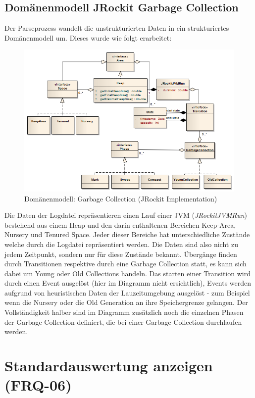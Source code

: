 \subsection{Domänenmodell JRockit Garbage Collection}\label{jrockit_domain_model}
Der Parseprozess wandelt die unstrukturierten Daten in ein strukturiertes Domänenmodell um. Dieses wurde wie folgt erarbeitet:
\begin{landscape}
 \begin{figure}[H]
  	\centering
        	\includegraphics[width=16.6cm]{images/jrockit_extension_domain}
	\caption{Domänenmodell: Garbage Collection (JRockit Implementation)}
\end{figure}
\end{landscape}
Die Daten der Logdatei repräsentieren einen Lauf einer JVM (\textit{JRockitJVMRun}) bestehend aus einem Heap und den darin enthaltenen Bereichen Keep-Area, Nursery und Tenured Space. Jeder dieser Bereiche hat unterschiedliche Zustände welche durch die Logdatei repräsentiert werden. Die Daten sind also nicht zu jedem Zeitpunkt, sondern nur für diese Zustände bekannt. Übergänge finden durch Transitionen respektive durch eine Garbage Collection statt, es kann sich dabei um Young oder Old Collections handeln. Das starten einer Transition wird durch einen Event ausgelöst (hier im Diagramm nicht ersichtlich), Events werden aufgrund von heuristischen Daten der Lauzeitumgebung ausgelöst - zum Beispiel wenn die Nursery oder die Old Generation an ihre Speichergrenze gelangen. Der Vollständigkeit halber sind im Diagramm zusätzlich noch die einzelnen Phasen der Garbage Collection definiert, die bei einer Garbage Collection durchlaufen werden.

\section{Standardauswertung anzeigen (FRQ-06)}
